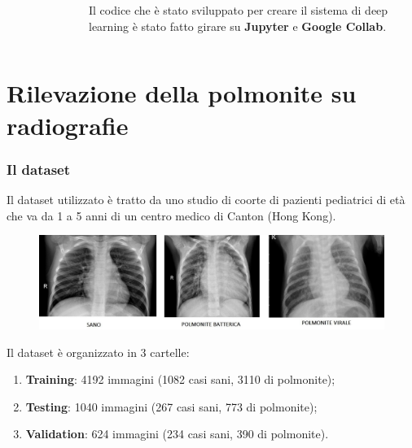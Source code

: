 \documentclass{beamer}
\begin{document}
\begin{frame}
\begin{columns}
\begin{figure}
		\end{figure}
		\bigskip

		
		\centering
		Il codice che è stato sviluppato per creare il sistema di deep learning è stato fatto girare su \textbf{Jupyter} e \textbf{Google Collab}.
		\bigskip\bigskip\bigskip
		
	\end{columns}
	
\end{frame}


	
\section{Rilevazione della polmonite su radiografie}
\begin{frame}
	\frametitle{Il dataset}
	Il dataset utilizzato è tratto
	 da uno studio di coorte di pazienti pediatrici di età che va da 1 a 5 anni di un centro medico di Canton (Hong Kong).
	 \smallskip
	\begin{figure}
		\includegraphics[width=1\textwidth]{sano.jpeg}
	\end{figure}
	Il dataset è organizzato in  3 cartelle: 
	\begin{enumerate}
		\item \textbf{Training}: 4192 immagini (1082 casi sani, 3110 di polmonite);
		\item \textbf{Testing}: 1040 immagini (267 casi sani, 773 di polmonite);
		\item \textbf{Validation}: 624 immagini (234 casi sani, 390 di polmonite).
	\end{enumerate}
	
\end{frame}
\end{document}
